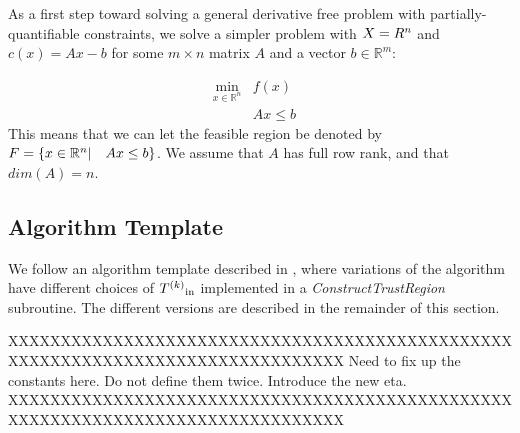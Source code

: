 As a first step toward solving a general derivative free problem with partially-quantifiable constraints,
we solve a simpler problem with $X = R^n$ and $c(x) = Ax-b$ for some $m\times n$ matrix $A$ and a vector $b\in \mathbb R^m$:

\[ \begin{array}{ccl} \min_{x \in \mathbb R^n} & f(x) \\
& Ax \le b & 
\end{array}
\]
This means that we can let the feasible region be denoted by ${F} = \{x \in \mathbb R^n | \quad  Ax \le b \}$.
We assume that $A$ has full row rank, and that  $dim(A) = n$.

\subsection{Algorithm Template}

We follow an algorithm template described in \cite{doi:10.1080/10556788.2015.1026968}, where variations of the algorithm have different choices of ${T^{(k)}}_{\text{in}}$ implemented in a \emph{ConstructTrustRegion} subroutine.
The different versions are described in the remainder of this section.


XXXXXXXXXXXXXXXXXXXXXXXXXXXXXXXXXXXXXXXXXXXXXXXXXXXXXXXXXXXXXXXXXXXXXXXXXXXXXXXX
Need to fix up the constants here.
Do not define them twice.
Introduce the new eta.
XXXXXXXXXXXXXXXXXXXXXXXXXXXXXXXXXXXXXXXXXXXXXXXXXXXXXXXXXXXXXXXXXXXXXXXXXXXXXXXX

